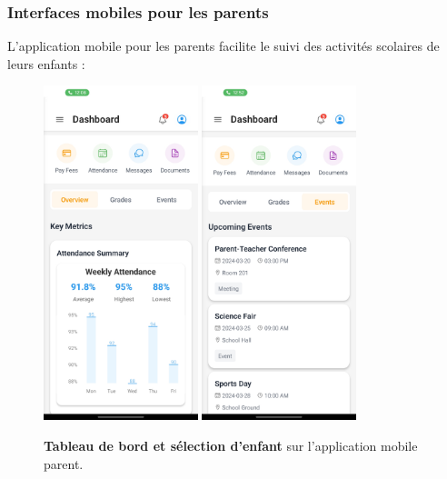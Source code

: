 \subsubsection{Interfaces mobiles pour les parents}

L'application mobile pour les parents facilite le suivi des activités scolaires de leurs enfants :

\begin{figure}[H]
  \centering
  \includegraphics[width=0.4\textwidth,keepaspectratio]{pfe-pics/Mobile /Parent /Screenshot_20250610_132939_Expo Go.jpg}
  \includegraphics[width=0.4\textwidth,keepaspectratio]{pfe-pics/Mobile /Parent /Screenshot_20250610_133022_Expo Go.jpg}
  \caption{\textbf{Tableau de bord et sélection d'enfant} sur l'application mobile parent.}
  \label{fig:mobile_parent_dashboard}
\end{figure}

